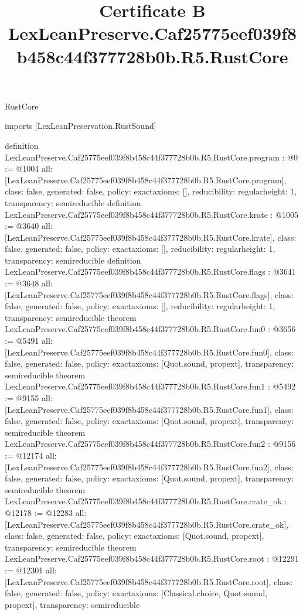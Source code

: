 \begin{lexlean}{RustCore}
\title{Certificate B LexLeanPreserve.Caf25775eef039f8b458c44f377728b0b.R5.RustCore}
\begin{coremodule}
imports [LexLeanPreservation.RustSound]

definition LexLeanPreserve.Caf25775eef039f8b458c44f377728b0b.R5.RustCore.program : @0 := @1004 {
  all: [LexLeanPreserve.Caf25775eef039f8b458c44f377728b0b.R5.RustCore.program],
  class: false,
  generated: false,
  policy: exact{axioms: []},
  reducibility: regular{height: 1},
  transparency: semireducible
}
definition LexLeanPreserve.Caf25775eef039f8b458c44f377728b0b.R5.RustCore.krate : @1005 := @3640 {
  all: [LexLeanPreserve.Caf25775eef039f8b458c44f377728b0b.R5.RustCore.krate],
  class: false,
  generated: false,
  policy: exact{axioms: []},
  reducibility: regular{height: 1},
  transparency: semireducible
}
definition LexLeanPreserve.Caf25775eef039f8b458c44f377728b0b.R5.RustCore.flags : @3641 := @3648 {
  all: [LexLeanPreserve.Caf25775eef039f8b458c44f377728b0b.R5.RustCore.flags],
  class: false,
  generated: false,
  policy: exact{axioms: []},
  reducibility: regular{height: 1},
  transparency: semireducible
}
theorem LexLeanPreserve.Caf25775eef039f8b458c44f377728b0b.R5.RustCore.fun0 : @3656 := @5491 {
  all: [LexLeanPreserve.Caf25775eef039f8b458c44f377728b0b.R5.RustCore.fun0],
  class: false,
  generated: false,
  policy: exact{axioms: [Quot.sound, propext]},
  transparency: semireducible
}
theorem LexLeanPreserve.Caf25775eef039f8b458c44f377728b0b.R5.RustCore.fun1 : @5492 := @9155 {
  all: [LexLeanPreserve.Caf25775eef039f8b458c44f377728b0b.R5.RustCore.fun1],
  class: false,
  generated: false,
  policy: exact{axioms: [Quot.sound, propext]},
  transparency: semireducible
}
theorem LexLeanPreserve.Caf25775eef039f8b458c44f377728b0b.R5.RustCore.fun2 : @9156 := @12174 {
  all: [LexLeanPreserve.Caf25775eef039f8b458c44f377728b0b.R5.RustCore.fun2],
  class: false,
  generated: false,
  policy: exact{axioms: [Quot.sound, propext]},
  transparency: semireducible
}
theorem LexLeanPreserve.Caf25775eef039f8b458c44f377728b0b.R5.RustCore.crate_ok : @12178 := @12283 {
  all: [LexLeanPreserve.Caf25775eef039f8b458c44f377728b0b.R5.RustCore.crate_ok],
  class: false,
  generated: false,
  policy: exact{axioms: [Quot.sound, propext]},
  transparency: semireducible
}
theorem LexLeanPreserve.Caf25775eef039f8b458c44f377728b0b.R5.RustCore.root : @12291 := @12301 {
  all: [LexLeanPreserve.Caf25775eef039f8b458c44f377728b0b.R5.RustCore.root],
  class: false,
  generated: false,
  policy: exact{axioms: [Classical.choice, Quot.sound, propext]},
  transparency: semireducible
}


\end{coremodule}
\end{lexlean}
